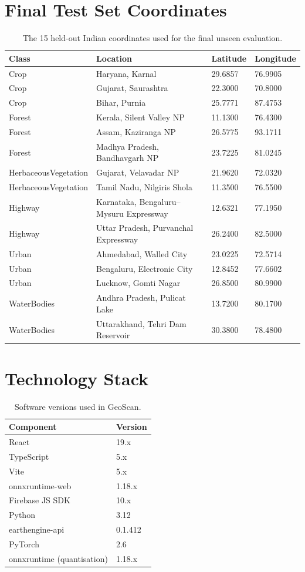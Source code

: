 \documentclass[journal]{IEEEtran}
\begin{document}
\section{Final Test Set Coordinates}

\begin{longtable}[]{@{}llll@{}}
\caption{The 15 held-out Indian coordinates used for the final
unseen evaluation.}\\
\toprule\noalign{}
Class & Location & Latitude & Longitude \\
\midrule\noalign{}
\endhead
\bottomrule\noalign{}
\endlastfoot
Crop & Haryana, Karnal & 29.6857 & 76.9905 \\
Crop & Gujarat, Saurashtra & 22.3000 & 70.8000 \\
Crop & Bihar, Purnia & 25.7771 & 87.4753 \\
Forest & Kerala, Silent Valley NP & 11.1300 & 76.4300 \\
Forest & Assam, Kaziranga NP & 26.5775 & 93.1711 \\
Forest & Madhya Pradesh, Bandhavgarh NP & 23.7225 & 81.0245 \\
HerbaceousVegetation & Gujarat, Velavadar NP & 21.9620 & 72.0320 \\
HerbaceousVegetation & Tamil Nadu, Nilgiris Shola & 11.3500 & 76.5500 \\
Highway & Karnataka, Bengaluru--Mysuru Expressway & 12.6321 & 77.1950 \\
Highway & Uttar Pradesh, Purvanchal Expressway & 26.2400 & 82.5000 \\
Urban & Ahmedabad, Walled City & 23.0225 & 72.5714 \\
Urban & Bengaluru, Electronic City & 12.8452 & 77.6602 \\
Urban & Lucknow, Gomti Nagar & 26.8500 & 80.9900 \\
WaterBodies & Andhra Pradesh, Pulicat Lake & 13.7200 & 80.1700 \\
WaterBodies & Uttarakhand, Tehri Dam Reservoir & 30.3800 & 78.4800 \\
\end{longtable}

\section{Technology Stack}

\begin{longtable}[]{@{}ll@{}}
\caption{Software versions used in GeoScan.}\\
\toprule\noalign{}
Component & Version \\
\midrule\noalign{}
\endhead
\bottomrule\noalign{}
\endlastfoot
React & 19.x \\
TypeScript & 5.x \\
Vite & 5.x \\
onnxruntime-web & 1.18.x \\
Firebase JS SDK & 10.x \\
Python & 3.12 \\
earthengine-api & 0.1.412 \\
PyTorch & 2.6 \\
onnxruntime (quantisation) & 1.18.x \\
\end{longtable}
\end{document}
